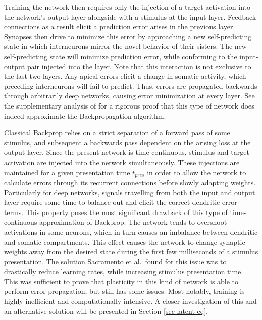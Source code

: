Training the network then requires only the injection of a target activation into the network's output layer alongside
with a stimulus at the input layer. Feedback connections as a result elicit a prediction error arises in the previous
layer. Synapses then drive to minimize this error by approaching a new self-predicting state in which interneurons
mirror the novel behavior of their sisters. The new self-predicting state will minimize prediction error, while
conforming to the input-output pair injected into the layer. Note that this interaction is not exclusive to the last two
layers. Any apical errors elicit a change in somatic activity, which preceding interneurons will fail to predict. Thus,
errors are propagated backwards through arbitrarily deep networks, causing error minimization at every layer. See the
supplementary analysis of \citep{sacramento2018dendritic} for a rigorous proof that this type of network does indeed
approximate the Backpropagation algorithm.



Classical Backprop relies on a strict separation of a forward pass of some stimulus, and subsequent a backwards pass
dependent on the arising loss at the output layer. Since the present network is time-continuous, stimulus and target
activation are injected into the network simultaneously. These injections are maintained for a given presentation time
$t_{pres}$ in order to allow the network to calculate errors through its recurrent connections before slowly adapting
weights. Particularly for deep networks, signals travelling from both the input and output layer require some time to
balance out and elicit the correct dendritic error terms. This property poses the most significant drawback of this type
of time-continuous approximation of Backprop: The network tends to overshoot activations in some neurons, which in turn
causes an imbalance between dendritic and somatic compartments. This effect causes the network to change synaptic
weights away from the desired state during the first few milliseconds of a stimulus presentation. The solution
Sacramento et al.\ found for this issue was to drastically reduce learning rates, while increasing stimulus presentation
time. This was sufficient to prove that plasticity in this kind of network is able to perform error propagation, but
still has some issues. Most notably, training is highly inefficient and computationally intensive. A closer
investigation of this and an alternative solution will be presented in Section \ref{sec-latent-eq}.



